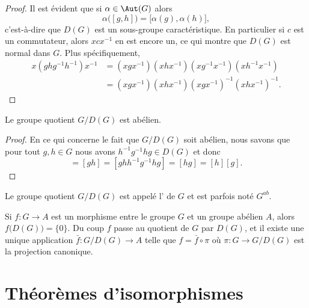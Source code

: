 \begin{proof}
	Il est évident que si \( \alpha\in\Aut(G)\) alors
	\begin{equation}
		\alpha\big( [g,h] \big)=\big[ \alpha(g),\alpha(h) \big],
	\end{equation}
	c'est-à-dire que \( D(G)\) est un sous-groupe caractéristique. En particulier si \( c\) est un commutateur, alors \( xcx^{-1}\) en est encore un, ce qui montre que \( D(G)\) est normal dans \( G\). Plus spécifiquement,
	\begin{subequations}
		\begin{align}
			x(ghg^{-1}h^{-1})x^{-1} & =(xgx^{-1})(xhx^{-1})(xg^{-1}x^{-1})(xh^{-1}x^{-1})  \\
			                        & =(xgx^{-1})(xhx^{-1})(xgx^{-1})^{-1}(xhx^{-1})^{-1}.
		\end{align}
	\end{subequations}
\end{proof}

\begin{proposition}\label{PropAPRGooHBkELf}
	Le groupe quotient \( G/D(G)\) est abélien.
\end{proposition}

\begin{proof}
	En ce qui concerne le fait que \( G/D(G)\) soit abélien, nous savons que pour tout \( g,h\in G\) nous avons \( h^{-1}g^{-1}hg\in D(G)\) et donc
	\begin{equation}
		[g][h]=[gh]=[ghh^{-1}g^{-1}hg]=[hg]=[h][g].
	\end{equation}
\end{proof}

Le groupe quotient \( G/D(G)\) est appelé l' de \( G\) et est parfois noté \( G^{ab}\).

Si \( f\colon G\to A\) est un morphisme entre le groupe \( G\) et un groupe abélien \( A\), alors \( f\big( D(G) \big)=\{ 0 \}\). Du coup \( f\) passe au quotient de \( G\) par \( D(G)\), et il existe une unique application \( \bar f\colon G/D(G)\to A\) telle que \( f=\bar f\circ \pi\) où \( \pi\colon G\to G/D(G)\) est la projection canonique.

\section{Théorèmes d'isomorphismes}

